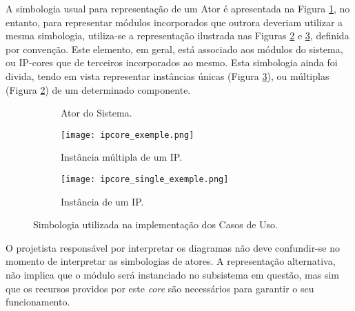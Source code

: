   A simbologia usual para representação de um Ator é apresentada na Figura \ref{fig:actor_exemple}, no entanto, para representar módulos incorporados que outrora deveriam utilizar a mesma simbologia, utiliza-se a representação ilustrada nas Figuras \ref{fig:ipcore_exemple} e \ref{fig:ipcore_single_exemple}, definida por convenção. Este elemento, em geral, está associado aos módulos do sistema, ou IP-cores que de terceiros incorporados ao mesmo. Esta simbologia ainda foi divida, tendo em vista representar instâncias únicas (Figura \ref{fig:ipcore_single_exemple}), ou múltiplas (Figura \ref{fig:ipcore_exemple}) de um determinado componente. 
  
  \FloatBarrier
  \begin{figure}[H]
    \centering
    \begin{subfigure}[b]{0.3\textwidth}
      \centering
      \caption{Ator do Sistema.}
      \label{fig:actor_exemple}
    \end{subfigure} 
    \begin{subfigure}[b]{0.3\textwidth}
      \centering
      \texttt{[image: ipcore\_exemple.png]}
      \caption{Instância múltipla de um IP.}
      \label{fig:ipcore_exemple}
    \end{subfigure}
    \begin{subfigure}[b]{0.3\textwidth}
      \centering
      \texttt{[image: ipcore\_single\_exemple.png]}
      \caption{Instância de um IP.}
      \label{fig:ipcore_single_exemple}
    \end{subfigure}
    \caption{Simbologia utilizada na implementação dos Casos de Uso.}
    \label{fig:actors}
  \end{figure}
  
  O projetista responsável por interpretar os diagramas não deve confundir-se no momento de interpretar as simbologias de atores. A representação alternativa, não implica que o módulo será instanciado no subsistema em questão, mas sim que os recursos providos por este \textit{core} são necessários para garantir o seu funcionamento.
  
